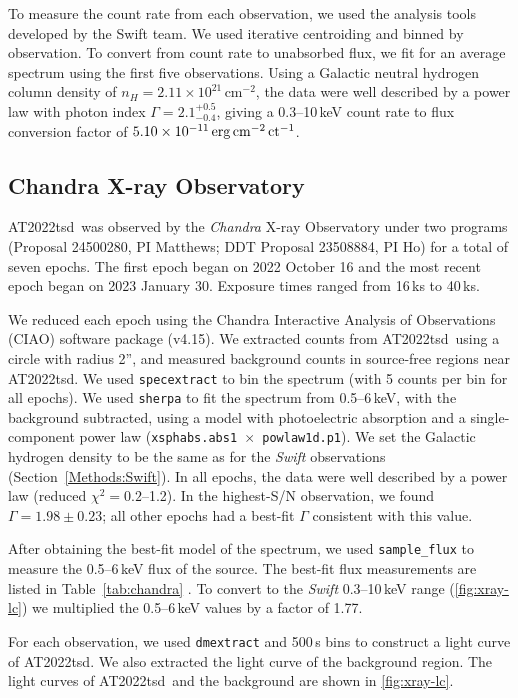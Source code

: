 \documentclass{nature_plusfigure}
\newcommand{\at}{AT2022tsd}
\begin{document}
\begin{methods}
To measure the count rate from each observation, we used the analysis tools developed by the Swift team\cite{Evans2007,Evans2009}.
We used iterative centroiding and binned by observation. 
To convert from count rate to unabsorbed flux, we fit for an average spectrum using the first five observations. Using a Galactic neutral hydrogen column density\cite{Willingale2013} of $n_H=2.11\times10^{21}\,$cm$^{-2}$, the data were well described by a power law with photon index $\Gamma=2.1^{+0.5}_{-0.4}$, 
giving a 0.3--10\,keV count rate to flux conversion factor of $5.10\times 10^{-11}\,\rm erg\,cm^{-2}\,ct^{-1}$.

\subsection{Chandra X-ray Observatory}
\label{sec:chandra}

\at\ was observed by the \emph{Chandra} X-ray Observatory under two programs (Proposal 24500280, PI Matthews; DDT Proposal 23508884, PI Ho) for a total of seven epochs. The first epoch began on 2022 October 16 and the most recent epoch began on 2023 January 30. Exposure times ranged from 16\,ks to 40\,ks.

We reduced each epoch using the Chandra Interactive Analysis of Observations (CIAO\cite{Fruscione2006}) software package (v4.15). We extracted counts from \at\ using a circle with radius 2'', and measured background counts in source-free regions near \at.
We used \texttt{specextract} to bin the spectrum (with 5 counts per bin for all epochs). We used \texttt{sherpa} to fit the spectrum from 0.5--6\,keV, with the background subtracted, using a model with photoelectric absorption and a single-component power law (\texttt{xsphabs.abs1 $\times$ powlaw1d.p1}). We set the Galactic hydrogen density to be the same as for the \emph{Swift} observations (Section~\ref{Methods:Swift}). In all epochs, the data were well described by a power law (reduced $\chi^2=0.2$--1.2). In the highest-S/N observation, we found $\Gamma=1.98\pm0.23$; all other epochs had a best-fit $\Gamma$ consistent with this value.

After obtaining the best-fit model of the spectrum, we used \texttt{sample\_flux} to measure the 0.5--6\,keV flux of the source. The best-fit flux measurements are listed in Table~\ref{tab:chandra} . To convert to the \emph{Swift} 0.3--10\,keV range (\ref{fig:xray-lc}) we multiplied the 0.5--6\,keV values by a factor of 1.77.

For each observation, we used \texttt{dmextract} and 500\,s bins to construct a light curve of \at. We also extracted the light curve of the background region. The light curves of \at\ and the background are shown in \ref{fig:xray-lc}. 


\end{methods}
\end{document}
